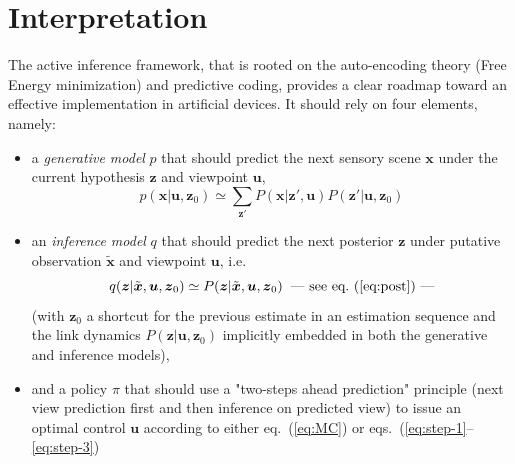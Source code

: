 \documentclass{article} %
\begin{document}

\section{Interpretation}

The active inference framework, that is rooted on the auto-encoding theory (Free Energy minimization) and predictive coding, provides a clear roadmap toward an effective implementation in artificial devices. It should rely on four elements, namely:
\begin{itemize}
	\item a \emph{generative model} $p$ that should predict the next sensory scene $\boldsymbol{x}$ under the current hypothesis $\boldsymbol{z}$ and viewpoint $\boldsymbol{u}$, 
$$p(\boldsymbol{x}|\boldsymbol{u}, \boldsymbol{z}_0) \simeq \sum_{\boldsymbol{z}'}P(\boldsymbol{x}|\boldsymbol{z}',\boldsymbol{u}) P(\boldsymbol{z}'|\boldsymbol{u},\boldsymbol{z}_0) $$
   \item an \emph{inference model} $q$ that should predict the next posterior $\boldsymbol{z}$ under putative observation $\tilde{\boldsymbol{x}}$ and viewpoint $\boldsymbol{u}$, i.e.
$$q(\boldsymbol{z}|\tilde{\boldsymbol{x}}, \boldsymbol{u},\boldsymbol{z}_0) \simeq  P(\boldsymbol{z}|\tilde{\boldsymbol{x}}, \boldsymbol{u},\boldsymbol{z}_0) \text{\hspace{.2cm}---~see eq.~(\ref{eq:post})~---}$$  %
(with $\boldsymbol{z}_0$ a shortcut for the previous estimate in an estimation sequence and the link dynamics $P(\boldsymbol{z}|\boldsymbol{u},\boldsymbol{z}_0)$ implicitly embedded in both the generative and inference models),
\item and a policy $\pi$ that should use a "two-steps ahead prediction" principle (next view prediction first and then inference on predicted view) to issue an optimal control $\boldsymbol{u}$ according to either eq.~(\ref{eq:MC}) or eqs.~(\ref{eq:step-1}--\ref{eq:step-3})
\end{itemize}  
\end{document}
